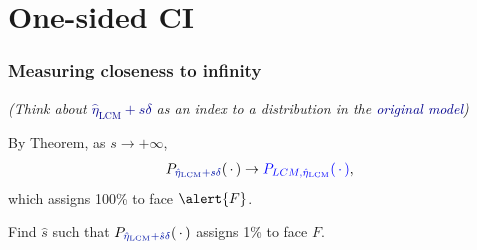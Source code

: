 \documentclass[ 10pt]{beamer}
\def\RR{{\mathbb R}}
\newcommand{\fatdot}{\,\cdot\,}
\newcommand{\etaLCM}{\hat{\eta}_{\textrm{LCM}}}
\begin{document}
\section{One-sided CI}
\frame
{
  \frametitle{Measuring closeness to infinity}  



%
%
%


\emph{(Think about \textcolor{darkblue}{$\etaLCM + s \delta$} as an index to a distribution in the \textcolor{darkblue}{original model})}
\vspace{3mm}

By Theorem, as $s \to +\infty$,
\begin{align*}
P_{\textcolor{darkblue}{\etaLCM + s \delta}}(\fatdot) \to \textcolor{blue}{P_{LCM, \etaLCM}(\fatdot)},
\end{align*}
which assigns 100\% to face $\alert{F}$.
\vspace{2mm}

\pause
Find $\hat{s}$ such that $P_{\textcolor{darkblue}{\etaLCM + \hat{s} \delta}}(\fatdot )$
assigns 1\% to face \alert{$F$}.  
\vspace{2mm}


}
\end{document}
